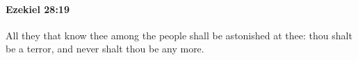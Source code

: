 
		\paragraph{Ezekiel 28:19} %
			\label{EZEKIEL-28-19}

			All they that know thee among the people shall be astonished at thee: thou shalt be a terror, and never shalt thou be any more.


